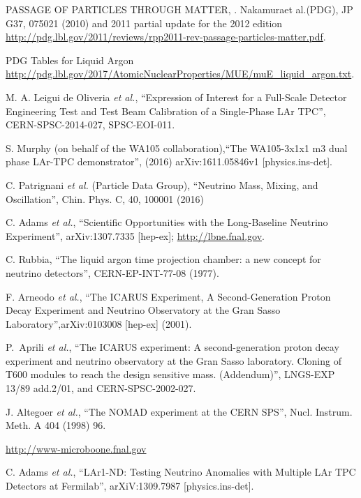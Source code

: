 \begin{thebibliography}{99}
\footnotesize

PASSAGE OF PARTICLES THROUGH MATTER, . Nakamuraet al.(PDG), JP G37, 075021 (2010) and 2011 partial update for the 2012 edition \url{http://pdg.lbl.gov/2011/reviews/rpp2011-rev-passage-particles-matter.pdf}.

PDG Tables for Liquid Argon \url{http://pdg.lbl.gov/2017/AtomicNuclearProperties/MUE/muE_liquid_argon.txt}. 

M. A. Leigui de Oliveria {\it et al.}, ``Expression of Interest for a Full-Scale Detector Engineering Test and Test Beam Calibration of a Single-Phase LAr TPC'',
CERN-SPSC-2014-027, SPSC-EOI-011.

S. Murphy (on behalf of the WA105 collaboration),``The WA105-3x1x1 m3 dual phase LAr-TPC demonstrator'', (2016) arXiv:1611.05846v1 [physics.ins-det].

C. Patrignani {\it et al.} (Particle Data Group), ``Neutrino Mass, Mixing, and Oscillation'', Chin. Phys. C, 40, 100001 (2016)

C. Adams {\it et al.}, ``Scientific Opportunities with the Long-Baseline Neutrino Experiment'', arXiv:1307.7335 [hep-ex]; \url{http://lbne.fnal.gov}.

C. Rubbia, ``The liquid argon time projection chamber: a new concept for neutrino detectors'', CERN-EP-INT-77-08 (1977).

F. Arneodo {\it et al.}, ``The ICARUS Experiment, A Second-Generation Proton Decay Experiment and Neutrino Observatory at the Gran Sasso Laboratory'',arXiv:0103008 [hep-ex] (2001).

P.~Aprili {\it et al.},
``The ICARUS experiment: A second-generation proton decay experiment and
neutrino observatory at the Gran Sasso laboratory. Cloning of T600 modules to
reach the design sensitive mass. (Addendum)'', 
LNGS-EXP 13/89 add.2/01, and CERN-SPSC-2002-027.

J. Altegoer {\it et al.}, ``The NOMAD experiment at the CERN SPS'', Nucl. Instrum. Meth. A 404 (1998) 96.

\url{http://www-microboone.fnal.gov}

C. Adams  {\it et al.}, ``LAr1-ND: Testing Neutrino Anomalies with Multiple LAr TPC Detectors at Fermilab'', arXiV:1309.7987 [physics.ins-det].


\end{thebibliography}
